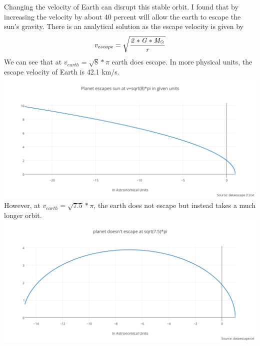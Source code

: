 \documentclass[11pt,a4wide]{article}
\begin{document}
\begin{enumerate}
Changing the velocity of Earth can disrupt this stable orbit. I found that by increasing the velocity by about 40 percent will allow the earth to escape the sun's gravity. There is an analytical solution as the escape velocity is given by
\[
\it v_{escape}=\sqrt{\frac{2*G*M_{\odot}}{r}}
\] We can see that at $v_{earth} = \sqrt{8}*\pi$ earth does escape. In more physical units, the escape velocity of Earth is 42.1 km/s. 
\centering
\includegraphics[width=6in]{planet_escapes_sun_at_vsqrt8pi_in_given_units.png}\\
However, at $v_{earth} = \sqrt{7.5}*\pi$, the earth does not escape but instead takes a much longer orbit. 
\includegraphics[width=6in]{planet_doesnt_escape_at_sqrt75pi.png}\\


\end{enumerate}
\end{document}
